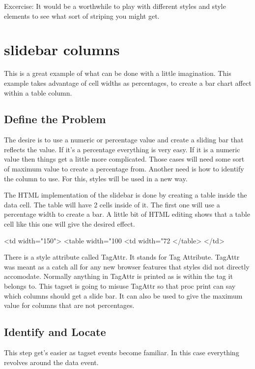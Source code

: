 Excercise:  It would be a worthwhile to play with different
styles and style elements to see what sort of striping you might
get.

\section{slidebar columns}
This is a great example of what can be done with a little
imagination.  This example takes advantage of cell widths
as percentages, to create a bar chart affect within a table column.

\subsection{Define the Problem}
The desire is to use a numeric or percentage value and 
create a sliding bar that reflects the value.  If it's a percentage
everything is very easy.  If it is a numeric value then things get
a little more complicated.  Those cases will need some sort of maximum
value to create a percentage from.  Another need is how to
identify the column to use.  For this, styles will be used in a new way.

The HTML implementation of the slidebar is done by creating a table 
inside the data cell.  The table will have 2 cells inside of it.  
The first one will use a percentage width to create a bar.  A little bit of
HTML editing shows that a table cell like this one will give the
desired effect.

\begin{sfvcode}
    <td width="150">
      <table width="100%
        <td width="72%
      </table>
    </td>
\end{sfvcode}

\label{slider}
There is a style attribute called TagAttr.  It stands for Tag Attribute.
TagAttr was meant as a catch all
for any new browser features that styles did not directly accomodate.
Normally anything in TagAttr is printed as is within the tag it belongs
to.  This tagset is going to misuse TagAttr so that proc print can say which columns
should get a slide bar.  It can also be used to give the maximum value for
columns that are not percentages.

\subsection{Identify and Locate}
This step get's easier as tagset events become familiar.  
In this case everything revolves around the data event. 

